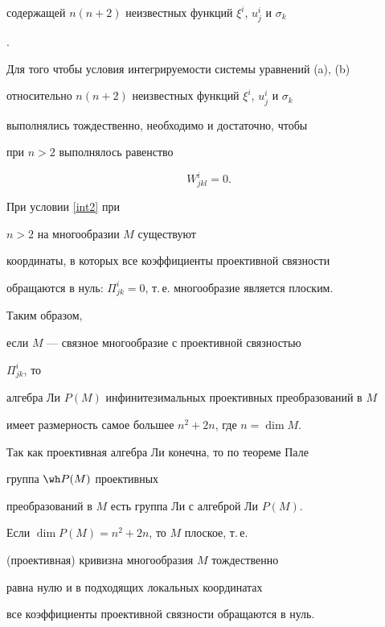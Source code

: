содержащей $n(n+2)$ неизвестных функций $\xi^i$, $u_j^i$ и $\sigma _{k}$


\cite{Egorov_65}.





Для того чтобы условия интегрируемости системы уравнений (a), (b)


относительно $n(n+2)$ неизвестных функций $\xi^i$, $u_j^i$ и $\sigma _{k}$


выполнялись тождественно, необходимо и достаточно, чтобы


при $n>2$ выполнялось равенство


\begin{equation}\label{int2}


W^i_{jkl}=0.


\end{equation}


При условии \eqref{int2} при


$n>2$ на многообразии $M$ существуют


координаты, в которых все коэффициенты проективной связности


обращаются в нуль: $\Pi^{i}_{jk}=0$, т.\,е. многообразие является плоским.





Таким образом,


если $M$ --- связное многообразие с проективной связностью


$\Pi^i_{jk}$, то 


алгебра Ли $P(M)$ инфинитезимальных проективных преобразований в $M$


имеет размерность самое большее $n^2 + 2n$, где $n = \dim M$.


Так как проективная алгебра Ли конечна, то по теореме Пале \cite{Palais_57}


группа $\wh P(M)$ проективных


преобразований в $M$ есть группа Ли с алгеброй Ли $P(M)$.





Если $\dim P(M)


= n^2 + 2n$, то $M$ плоское, т.\,е.


(проективная) кривизна многообразия $M$ тождественно


равна нулю и в подходящих локальных координатах


все коэффициенты проективной связности обращаются в нуль.





